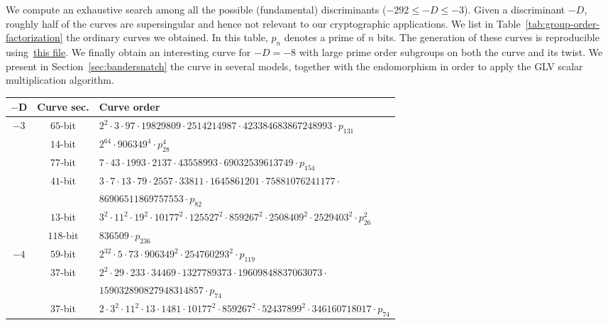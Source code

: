 \documentclass{article}
\theoremstyle{definition}
\begin{document}
We compute an exhaustive search among all the possible (fundamental)
discriminants ($-292 \leq -D \leq -3$).
Given a discriminant $-D$, roughly half of the curves are
supersingular and hence not relevant to our cryptographic
applications.
We list in Table~\ref{tab:group-order-factorization} the ordinary
curves we obtained. In this table, $p_n$ denotes a prime of $n$ bits.
The generation of these curves is reproducible
using~\href{https://github.com/asanso/Bandersnatch/blob/main/python-ref-impl/small-disc-curves.py}{this
  file}.
We finally obtain an interesting curve for $-D = -8$ with large prime
order subgroups on both the curve and its twist.
We present in Section~\ref{sec:bandersnatch} the curve in several
models, together with the endomorphism in order to apply the GLV
scalar multiplication algorithm.

\begin{table}[!ht]
    \centering\footnotesize
    \begin{tabularx}{\textwidth}{ccl}
        \toprule                            
        $\mathbf{-D}$    & \textbf{Curve sec.}  & \textbf{Curve order} \\
        \midrule        
$-3$ & $65$-bit & $2^{2}  \cdot 3  \cdot 97  \cdot 19829809  \cdot 2514214987  \cdot 423384683867248993  \cdot p_{131}$\\
 & $14$-bit & $2^{64}  \cdot 906349^{4}  \cdot p_{28}^{4}$\\
 & $77$-bit & $7  \cdot 43  \cdot 1993  \cdot 2137  \cdot 43558993  \cdot 69032539613749  \cdot p_{154}$\\
 & $41$-bit & $3  \cdot 7  \cdot 13  \cdot 79  \cdot 2557  \cdot 33811
        \cdot 1645861201  \cdot 75881076241177 \cdot$\\
 &          & $86906511869757553  \cdot p_{82}$\\
 & $13$-bit & $3^{2}  \cdot 11^{2}  \cdot 19^{2}  \cdot 10177^{2}  \cdot 125527^{2}  \cdot 859267^{2}  \cdot 2508409^{2}  \cdot 2529403^{2}  \cdot p_{26}^{2}$\\
 & $118$-bit & $836509  \cdot p_{236}$\\
$-4$ & $59$-bit & $2^{32}  \cdot 5  \cdot 73  \cdot 906349^{2}  \cdot 254760293^{2}  \cdot p_{119}$\\
 & $37$-bit & $2^{2}  \cdot 29  \cdot 233  \cdot 34469  \cdot
        1327789373  \cdot 19609848837063073 \cdot$\\
 &          & $159032890827948314857  \cdot p_{74}$\\
 & $37$-bit & $2  \cdot 3^{2}  \cdot 11^{2}  \cdot 13  \cdot 1481  \cdot 10177^{2}  \cdot 859267^{2}  \cdot 52437899^{2}  \cdot 346160718017  \cdot p_{74}$\\

\end{tabularx}
\end{table}
\end{document}
